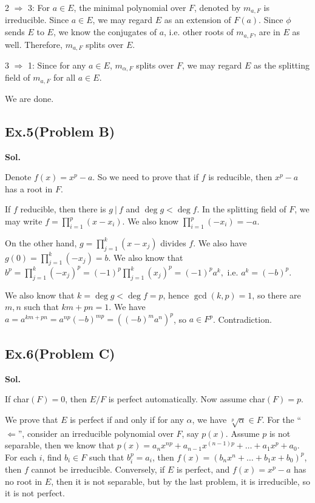 \documentclass[lang=en,11pt,a4paper,citestyle =authoryear]{elegantpaper}
\begin{document}
2 $\Rightarrow$ 3: For $a\in E$, the minimal polynomial over $F$, denoted by $m_{a, F}$ is irreducible. Since $a\in E$, we may regard $E$ as an extension of $F(a)$. Since $\phi$ sends $E$ to $E$, we know the conjugates of $a$, i.e. other roots of $m_{a,F}$, are in $E$ as well. Therefore, $m_{a,F}$ splits over $E$.

3 $\Rightarrow$ 1: Since for any $a\in E$, $m_{\alpha, F}$ splits over $F$, we may regard $E$ as the splitting field of $m_{a, F}$ for all $a\in E$.

We are done.
\par 
\vspace{0.5em}

\subsection*{Ex.5(Problem B)}
\textbf{Sol.} \par
   Denote $f(x)=x^p-a$. So we need to prove that if $f$ is reducible, then $x^p-a$ has a root in $F$.

If $f$ reducible, then there is $g\ |\ f$ and $\deg g<\deg f$. In the splitting field of $F$, we may write $f=\prod_{i=1}^p (x-x_i)$. We also know $\prod_{i=1}^p(-x_i)=-a.$ 

On the other hand, $g=\prod_{j=1}^k (x-x_j)$ divides $f$. We also have $g(0)=\prod_{j=1}^k(-x_j)=b$. We also know that $b^p=\prod_{j=1}^k(-x_j)^p=(-1)^p\prod_{j=1}^k(x_j)^p=(-1)^pa^k,$ i.e. $a^k=(-b)^p$. 

We also know that $k=\deg g<\deg f=p$, hence $\gcd(k,p)=1$, so there are $m,n$ such that $km+pn=1$. We have $a=a^{km+pn}=a^{np}(-b)^{mp}=((-b)^ma^n)^p$, so $a\in F^p$. Contradiction.
\par 
\vspace{0.5em}

\subsection*{Ex.6(Problem C)}
\textbf{Sol.} \par
If char$(F)=0$, then $E/F$ is perfect automatically. Now assume char$(F)=p$. 

We prove that $E$ is perfect if and only if for any $\alpha$, we have $\sqrt[p]{\alpha}\in F$. For the ``$\Leftarrow$'', consider an irreducible polynomial over $F$, say $p(x)$. Assume $p$ is not separable, then we know that $p(x)=a_nx^{np}+a_{n-1}x^{(n-1)p}+\dots+a_1x^p+a_0$. For each $i$, find $b_i\in F$ such that $b_i^p=a_i$, then $f(x)=(b_nx^n+\dots+b_1x+b_0)^p$, then $f$ cannot be irreducible. 
Conversely, if $E$ is perfect, and $f(x)=x^p-a$ has no root in $E$, then it is not separable, but by the last problem, it is irreducible, so it is not perfect.
\end{document}
